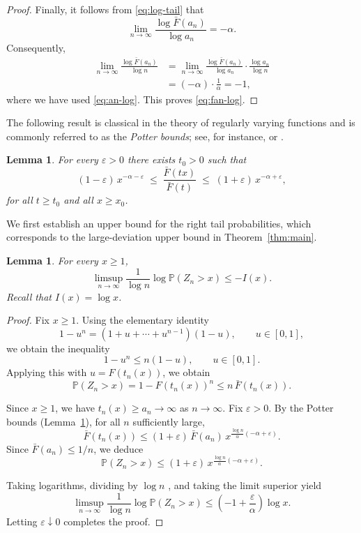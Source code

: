 \documentclass[11pt,reqno]{amsart}
\newtheorem{lemma}[theorem]{Lemma}
\theoremstyle{definition}
\theoremstyle{remark}
\numberwithin{equation}{section}
\newcommand{\PP}{\mathbb{P}}
\begin{document}
\begin{proof}
Finally, it follows from \eqref{eq:log-tail} that
\[
\lim_{n\to\infty}\frac{\log\bar{F}(a_n)}{\log a_n}=-\alpha.
\]
Consequently,
\begin{align*}
\lim_{n\to\infty}\frac{\log\bar{F}(a_n)}{\log n}
&=
\lim_{n\to\infty}
\frac{\log\bar{F}(a_n)}{\log a_n}
\cdot
\frac{\log a_n}{\log n} \\
&=
(-\alpha)\cdot \frac{1}{\alpha}
=
-1,
\end{align*}
where we have used \eqref{eq:an-log}. This proves \eqref{eq:fan-log}.
\end{proof}


The following result is classical in the theory of regularly varying functions and is commonly referred to as the \emph{Potter bounds}; see, for instance, 
\cite[Proposition~0.8(ii), p.~22]{resnick} or \cite[Theorem~1.5.6]{bingham}.

\begin{lemma}\label{lem:Potter} 
For every $\varepsilon>0$ there exists $t_0>0$ such that
\[
(1-\varepsilon)\,x^{-\alpha-\varepsilon}
\;\le\;
\frac{\bar F(tx)}{\bar F(t)}
\;\le\;
(1+\varepsilon)\,x^{-\alpha+\varepsilon},
\]
for all $t\ge t_0$ and all $x\ge x_0$.
\end{lemma}


We first establish an upper bound for the right tail probabilities, which corresponds
to the large-deviation upper bound in Theorem~\ref{thm:main}.

\begin{lemma}\label{lem:limsup}
For every \(x \ge 1\),
\[
\limsup_{n\to\infty}\frac{1}{\log n}\log \PP(Z_n>x)\le -I(x).
\]
Recall that $I(x)=\log x$.
\end{lemma}

\begin{proof}
Fix \(x\ge1\).
Using the elementary identity
\[
1-u^n=(1+u+\cdots+u^{n-1})(1-u), \qquad u\in[0,1],
\]
we obtain the inequality
\[
1-u^n \le n(1-u), \qquad u\in[0,1].
\]
Applying this with \(u=F(t_n(x))\), we obtain
\[
\PP(Z_n>x)
=
1-F(t_n(x))^n
\le
n\,\bar F(t_n(x)).
\]

Since \(x\ge1\), we have \(t_n(x)\ge a_n\to\infty\) as \(n\to\infty\).
Fix \(\varepsilon>0\). By the Potter bounds (Lemma~\ref{lem:Potter}), for all \(n\) sufficiently large,
\[
\bar F(t_n(x))
\le
(1+\varepsilon)\,\bar F(a_n)\,x^{\frac{\log n}{\alpha}(-\alpha+\varepsilon)}.
\]
Since \(\bar F(a_n)\le 1/n\), we deduce
\[
\PP(Z_n>x)
\le
(1+\varepsilon)\,x^{\frac{\log n}{\alpha}(-\alpha+\varepsilon)}.
\]

Taking logarithms, dividing by \(\log n\) , and taking the limit superior yield 
\[
\limsup_{n\to\infty}
\frac{1}{\log n}\log \PP(Z_n>x)
\le
\left(-1+\frac{\varepsilon}{\alpha}\right)\log x.
\]
Letting \(\varepsilon\downarrow0\) completes the proof.
\end{proof}
\end{document}

